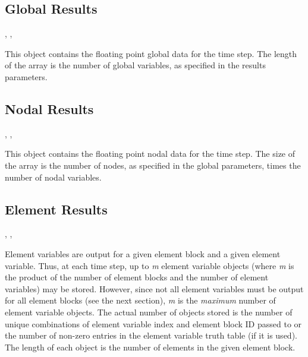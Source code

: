 \subsection{Global Results}

\begin{spacing}{1.5}
\api {}, , 
\end{spacing}

This object contains the floating point global data for the time
step. The length of the array is the number of global variables, as
specified in the results parameters.


\subsection{Nodal Results}

\begin{spacing}{1.5}
\api {}, , 
\end{spacing}

This object contains the floating point nodal data for the 
time step. The size of the array is the number of nodes, as specified 
in the global parameters, times the number of nodal variables.

\subsection{Element Results}

\begin{spacing}{1.5}
\api {}, , 
\end{spacing}

Element variables are output for a given element block and a given
element variable. Thus, at each time step, up to \textit{{m}} element
variable objects (where \textit{{m}} is the product of the number of
element blocks and the number of element variables) may be
stored. However, since not all element variables must be output for
all element blocks (see the next section), \textit{{m}} is the
\textit{{maximum}} number of element variable objects. The actual
number of objects stored is the number of unique combinations of
element variable index and element block ID passed to
 or the number of non-zero entries in the
element variable truth table (if it is used). The length of each
object is the number of elements in the given element block.



